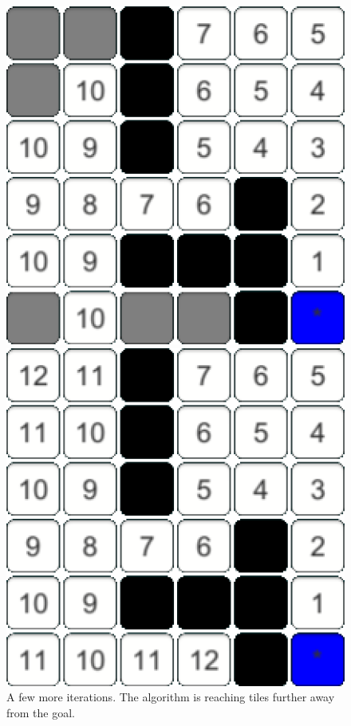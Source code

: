 \documentclass[conference]{IEEEtran}
\begin{document}
\begin{figure}[h]
\centering
\begin{minipage}[t]{0.3\linewidth}
\centering
\includegraphics[width=1\textwidth]{images/intro/more.png}
\caption{A few more iterations. The algorithm is reaching tiles further away from the goal.}
\end{minipage}
\hfill
\begin{minipage}[t]{0.3\linewidth}
\centering
\includegraphics[width=1\textwidth]{images/intro/final.png}

\end{minipage}
\end{figure}
\end{document}

